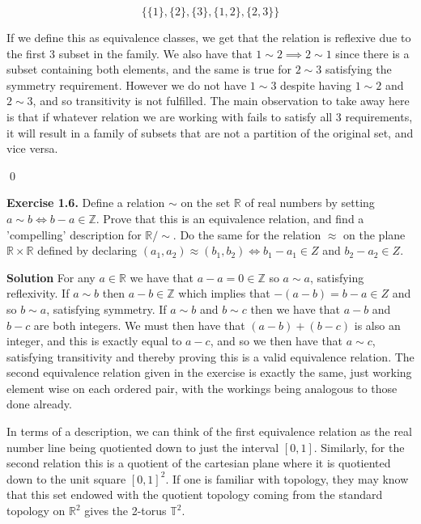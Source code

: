 \documentclass[titlepage]{article}
\begin{document}
\[ \{ \{1 \}, \{2 \}, \{3 \}, \{1,2 \}, \{2,3 \} \} \]

If we define this as equivalence classes, we get that the relation is reflexive due to the first 3 subset in the family. We also have that $1 \sim 2 \implies 2 \sim 1$ since there is a subset containing both elements, and the same is true for $2 \sim 3$ satisfying the symmetry requirement. However we do not have $1 \sim 3$ despite having $1 \sim 2$ and $2 \sim 3$, and so transitivity is not fulfilled. The main observation to take away here is that if whatever relation we are working with fails to satisfy all 3 requirements, it will result in a family of subsets that are not a partition of the original set, and vice versa.

\qed

\bigskip

\textbf{Exercise 1.6.} Define a relation $\sim$ on the set $\mathbb{R}$ of real numbers by setting $a \sim b \iff b - a \in \mathbb{Z}$. Prove that this is an equivalence relation, and find a 'compelling' description for $\mathbb{R} / \sim$. Do the same for the relation $\approx$ on the plane $\mathbb{R} \times \mathbb{R}$ defined by declaring $(a_1,a_2) \approx (b_1,b_2) \iff b_1 - a_1 \in Z$ and $b_2 - a_2 \in Z$.

\medskip

\textbf{Solution} For any $a \in \mathbb{R}$ we have that $a-a=0 \in \mathbb{Z}$ so $a \sim a$, satisfying reflexivity. If $a \sim b$ then $a-b \in \mathbb{Z}$ which implies that $-(a-b) = b-a \in Z$ and so $b \sim a$, satisfying symmetry. If $a \sim b$ and $b \sim c$ then we have that $a-b$ and $b-c$ are both integers. We must then have that $(a-b) + (b-c)$ is also an integer, and this is exactly equal to $a-c$, and so we then have that $a \sim c$, satisfying transitivity and thereby proving this is a valid equivalence relation. The second equivalence relation given in the exercise is exactly the same, just working element wise on each ordered pair, with the workings being analogous to those done already.
\smallskip

In terms of a description, we can think of the first equivalence relation as the real number line being quotiented down to just the interval $[0,1]$. Similarly, for the second relation this is a quotient of the cartesian plane where it is quotiented down to the unit square $[0,1]^2$. If one is familiar with topology, they may know that this set endowed with the quotient topology coming from the standard topology on $\mathbb{R}^2$ gives the 2-torus $\mathbb{T}^2$.
\end{document}
